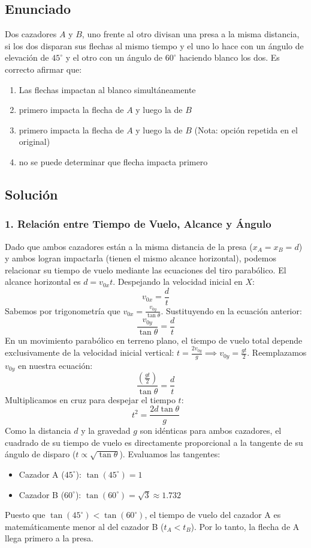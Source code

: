 \documentclass[12pt, a4paper]{article}
\begin{document}
\newpage

\subsection*{Enunciado}
Dos cazadores $A$ y $B$, uno frente al otro divisan una presa a la misma distancia, si los dos disparan sus flechas al mismo tiempo y el uno lo hace con un ángulo de elevación de $45^\circ$ y el otro con un ángulo de $60^\circ$ haciendo blanco los dos. Es correcto afirmar que:
\begin{enumerate}[label=\alph*)]
    \item Las flechas impactan al blanco simultáneamente
    \item primero impacta la flecha de $A$ y luego la de $B$
    \item primero impacta la flecha de $A$ y luego la de $B$ (Nota: opción repetida en el original)
    \item no se puede determinar que flecha impacta primero
\end{enumerate}

\subsection*{Solución}

\subsubsection*{1. Relación entre Tiempo de Vuelo, Alcance y Ángulo}
Dado que ambos cazadores están a la misma distancia de la presa ($x_A = x_B = d$) y ambos logran impactarla (tienen el mismo alcance horizontal), podemos relacionar su tiempo de vuelo mediante las ecuaciones del tiro parabólico.
El alcance horizontal es $d = v_{0x} t$. Despejando la velocidad inicial en $X$:
$$ v_{0x} = \frac{d}{t} $$
Sabemos por trigonometría que $v_{0x} = \frac{v_{0y}}{\tan\theta}$. Sustituyendo en la ecuación anterior:
$$ \frac{v_{0y}}{\tan\theta} = \frac{d}{t} $$
En un movimiento parabólico en terreno plano, el tiempo de vuelo total depende exclusivamente de la velocidad inicial vertical: $t = \frac{2v_{0y}}{g} \implies v_{0y} = \frac{gt}{2}$.
Reemplazamos $v_{0y}$ en nuestra ecuación:
$$ \frac{\left(\frac{gt}{2}\right)}{\tan\theta} = \frac{d}{t} $$
Multiplicamos en cruz para despejar el tiempo $t$:
$$ t^2 = \frac{2d \tan\theta}{g} $$
Como la distancia $d$ y la gravedad $g$ son idénticas para ambos cazadores, el cuadrado de su tiempo de vuelo es directamente proporcional a la tangente de su ángulo de disparo ($t \propto \sqrt{\tan\theta}$).
Evaluamos las tangentes:
\begin{itemize}
    \item Cazador A ($45^\circ$): $\tan(45^\circ) = 1$
    \item Cazador B ($60^\circ$): $\tan(60^\circ) = \sqrt{3} \approx 1.732$
\end{itemize}
Puesto que $\tan(45^\circ) < \tan(60^\circ)$, el tiempo de vuelo del cazador A es matemáticamente menor al del cazador B ($t_A < t_B$). Por lo tanto, la flecha de A llega primero a la presa.
\end{document}
